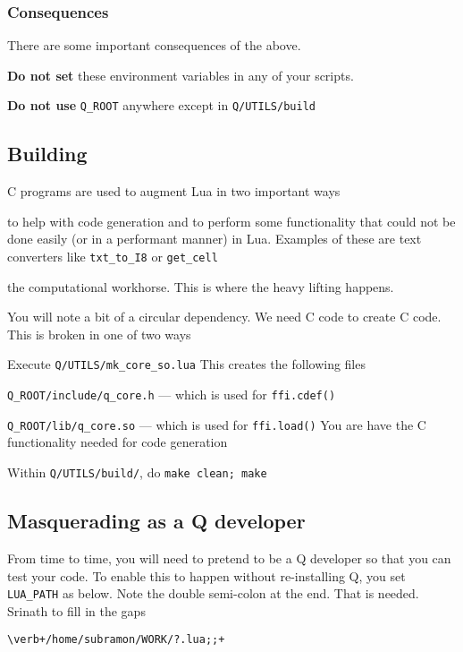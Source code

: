 \subsubsection{Consequences}

There are some important consequences of the above. 
\be
\item 
{\bf Do  not set} these environment variables in any of your scripts.
\item {\bf Do not use} \verb+Q_ROOT+ anywhere except in \verb+Q/UTILS/build+
\ee


\subsection{Building}

C programs are used to augment Lua in two important ways
\be
\item to help with code generation and to perform some functionality that 
could not be done easily (or in a performant manner) in Lua. Examples
of these are text converters like \verb+txt_to_I8+ or \verb+get_cell+
\item the computational workhorse. This is where the heavy lifting happens.
\ee

You will note a bit of a circular dependency. We need C code to create
C code.  This is broken in one of two ways
\be
\item Execute \verb+Q/UTILS/mk_core_so.lua+ This creates the following 
files 
\be
\item \verb+Q_ROOT/include/q_core.h+ --- which is used for \verb+ffi.cdef()+
\item \verb+Q_ROOT/lib/q_core.so+ --- which is used for \verb+ffi.load()+
\ee
You are have the C functionality needed for code generation

\item Within \verb+Q/UTILS/build/+, do {\tt make clean; make} 
\ee

\subsection{Masquerading as a Q developer}
\label{masquerade}

From time to time, you will need to pretend to be a Q developer so that you can
test your code. To enable this to happen without re-installing Q, you set
\verb+LUA_PATH+ as below. Note the double semi-colon at the end. That is needed.
Srinath to fill in the gaps \TBC
\begin{verbatim}
\verb+/home/subramon/WORK/?.lua;;+
\end{verbatim}
